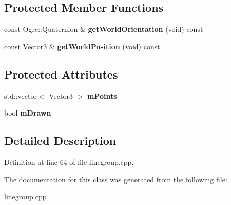 \subsection*{Protected Member Functions}
\begin{DoxyCompactItemize}
\item 
\hypertarget{classphys_1_1internal_1_1Line3D_a68aea39fc0eee3eeb744c5cd151ef209}{
const Ogre::Quaternion \& {\bfseries getWorldOrientation} (void) const }
\label{d4/db5/classphys_1_1internal_1_1Line3D_a68aea39fc0eee3eeb744c5cd151ef209}

\item 
\hypertarget{classphys_1_1internal_1_1Line3D_a2e81ac3696fedb22bd08688f7ecba2a8}{
const Vector3 \& {\bfseries getWorldPosition} (void) const }
\label{d4/db5/classphys_1_1internal_1_1Line3D_a2e81ac3696fedb22bd08688f7ecba2a8}

\end{DoxyCompactItemize}
\subsection*{Protected Attributes}
\begin{DoxyCompactItemize}
\item 
\hypertarget{classphys_1_1internal_1_1Line3D_acb6b813e2d713dbad02fe5a5ca1af97e}{
std::vector$<$ Vector3 $>$ {\bfseries mPoints}}
\label{d4/db5/classphys_1_1internal_1_1Line3D_acb6b813e2d713dbad02fe5a5ca1af97e}

\item 
\hypertarget{classphys_1_1internal_1_1Line3D_a7f3a190db3c0cd83ff4fdf3d95d6f0ee}{
bool {\bfseries mDrawn}}
\label{d4/db5/classphys_1_1internal_1_1Line3D_a7f3a190db3c0cd83ff4fdf3d95d6f0ee}

\end{DoxyCompactItemize}


\subsection{Detailed Description}


Definition at line 64 of file linegroup.cpp.



The documentation for this class was generated from the following file:\begin{DoxyCompactItemize}
\item 
linegroup.cpp\end{DoxyCompactItemize}
